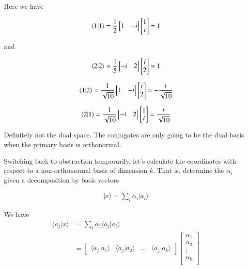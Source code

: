 \documentclass{article}
\newcommand{\ket}[1]{\lvert {#1} \rangle}
\newcommand{\braket}[2]{\langle{#1} \vert {#2}\rangle}
\begin{document}
Here we have

\begin{align*}
\braket{1}{1} = 
\inv{2}
\begin{bmatrix}
1 & -i
\end{bmatrix}
\begin{bmatrix}
1 \\
i
\end{bmatrix}
= 1
\end{align*}

and 

\begin{align*}
\braket{2}{2} = 
\inv{5}
\begin{bmatrix}
-i & 2 
\end{bmatrix}
\begin{bmatrix}
i \\
2
\end{bmatrix}
= 1
\end{align*}

\begin{align*}
\braket{1}{2} = 
\inv{\sqrt{10}}
\begin{bmatrix}
1 & -i
\end{bmatrix}
\begin{bmatrix}
i \\
2
\end{bmatrix}
= -\frac{i}{\sqrt{10}}
\end{align*}

\begin{align*}
\braket{2}{1} = 
\inv{\sqrt{10}}
\begin{bmatrix}
-i & 2
\end{bmatrix}
\begin{bmatrix}
1 \\
i
\end{bmatrix}
= \frac{i}{\sqrt{10}}
\end{align*}

Definitely not the dual space.  The conjugates are only going to be the dual basis when the primary basis is orthonormal.

Switching back to abstraction temporarily, let's calculate the coordinates with respect to a non-orthonormal
basis of dimension $k$.  That is, determine the $\alpha_i$ given a decomposition by basis vectors

\begin{align*}
\ket{x} = \sum_i \alpha_i \ket{a_i}
\end{align*}

We have 
\begin{align*}
\braket{a_j}{x} 
&= \sum_i \alpha_i \braket{a_j}{a_i} \\
&=
\begin{bmatrix}
\braket{a_j}{a_1} & \braket{a_j}{a_2} & \hdots & \braket{a_j}{a_k}
\end{bmatrix}
\begin{bmatrix}
\alpha_1 \\
\alpha_2 \\
\vdots \\
\alpha_k \\
\end{bmatrix}
\end{align*}
\end{document}
